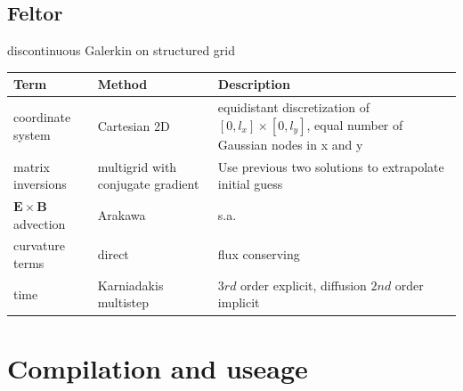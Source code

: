 \documentclass{hitec} %
\newcommand{\ExB}{$\bm{E}\times\bm{B} \,$}
\begin{document}
\subsection{Feltor}
discontinuous Galerkin on structured grid
\begin{longtable}{ll>{\RaggedRight}p{7cm}}
\toprule
\rowcolor{gray!50}\textbf{Term} &  \textbf{Method} & \textbf{Description}  \\ \midrule
coordinate system & Cartesian 2D & equidistant discretization of $[0,l_x] \times [0,l_y]$, equal number of Gaussian nodes in x and y \\
matrix inversions & multigrid with conjugate gradient & Use previous two solutions to extrapolate initial guess \\
\ExB advection & Arakawa & s.a. \cite{Einkemmer2013} \\
curvature terms & direct & flux conserving \\
time &  Karniadakis multistep & $3rd$ order explicit, diffusion $2nd$ order implicit \\
\bottomrule
\end{longtable}

\section{Compilation and useage}
\end{document}
